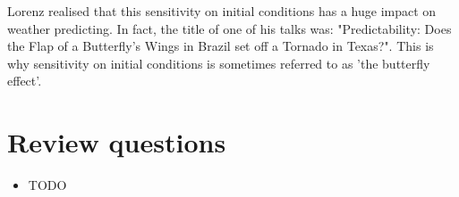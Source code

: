 Lorenz realised that this sensitivity on initial conditions has a huge impact on weather predicting. In fact, the title of one of his talks was: "Predictability: Does the Flap of a Butterfly's Wings in Brazil set off a Tornado in Texas?". This is why sensitivity on initial conditions is sometimes referred to as 'the butterfly effect'.


\section*{Review questions}

\begin{itemize}
\item TODO 
\end{itemize}



